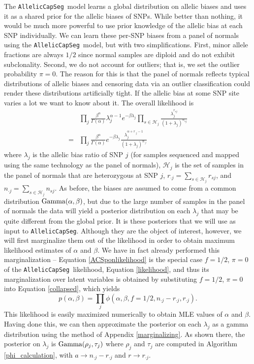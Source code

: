 \documentclass[nofootinbib,amssymb,amsmath]{revtex4}
\newcommand{\ACS}{\texttt{AllelicCapSeg}}
\begin{document}
The \ACS~model learns a global distribution on allelic biases and uses it as a shared prior for the allelic biases of SNPs.  While better than nothing, it would be much more powerful to use prior knowledge of the allelic bias at each SNP individually.  We can learn these per-SNP biases from a panel of normals using the \ACS~model, but with two simplifications.  First, minor allele fractions are always $1/2$ since normal samples are diploid and do not exhibit subclonality.  Second, we do not account for outliers; that is, we set the outlier probability $\pi = 0$.  The reason for this is that the panel of normals reflects typical distributions of allelic biases and censoring data via an outlier classification could render these distributions artificially tight.  If the allelic bias at some SNP site varies a lot we want to know about it. The overall likelihood is
%
\begin{align}
& \prod_j \frac{\beta^\alpha}{\Gamma(\alpha)} \lambda_j^{\alpha - 1} e^{-\beta \lambda_j}
\prod_{s \in \mathcal{H}_j}
 \frac{  \lambda_j^{r_{sj}}}{ \left( 1 + \lambda_j \right)^{n_{sj}}}  \\
 = & \prod_j \frac{\beta^\alpha}{\Gamma(\alpha)} e^{-\beta \lambda_j}
 \frac{  \lambda_j^{\alpha + r_{ \cdot j} - 1}}{ \left( 1 + \lambda_j \right)^{n_{\cdot j}}} 
 \label{ACSponlikelihood}
\end{align}
%
where $\lambda_j$ is the allelic bias ratio of SNP $j$ (for samples sequenced and mapped using the same technology as the panel of normals), $\mathcal{H}_j$ is the set of samples in the panel of normals that are heterozygous at SNP $j$, $r_{\cdot j} = \sum_{s \in \mathcal{H}_j} r_{sj}$, and $n_{\cdot j} = \sum_{s \in \mathcal{H}_j} n_{sj}$.  As before, the biases are assumed to come from a common distribution ${\rm Gamma}(\alpha, \beta)$, but due to the large number of samples in the panel of normals the data will yield a posterior distribution on each $\lambda_j$ that may be quite different from the global prior.  It is these posteriors that we will use as input to \ACS.  Although they are the object of interest, however, we will first marginalize them out of the likelihood in order to obtain maximum likelihood estimates of $\alpha$ and $\beta$.  We have in fact already performed this marginalization -- Equation \ref{ACSponlikelihood} is the special case $f = 1/2$, $\pi = 0$ of the \ACS~likelihood, Equation \ref{likelihood}, and thus its marginalization over latent variables is obtained by substituting $f = 1/2$, $\pi = 0$ into Equation \ref{collapsed}, which yields
%
\begin{equation}
p(\alpha, \beta) = \prod_j \phi(\alpha, \beta, f = 1/2, n_{\cdot j} - r_{\cdot j}, r_{\cdot j}).
\end{equation}
%
This likelihood is easily maximized numerically to obtain MLE values of $\alpha$ and $\beta$.  Having done this, we can then approximate the posterior on each $\lambda_j$ as a gamma distribution using the method of Appendix \ref{marginalizing}.  As shown there, the posterior on $\lambda_j$ is ${\rm Gamma}(\rho_j, \tau_j)$ where $\rho_j$ and $\tau_j$ are computed in Algorithm \ref{phi_calculation}, with $a \rightarrow n_{\cdot j} - r_{\cdot j}$ and $r \rightarrow r_{\cdot j}$.
\end{document}
